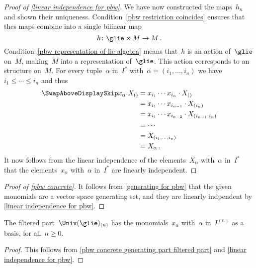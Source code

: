 \begin{proof}[Proof of \cref{linear independence for pbw}]
	We have now constructed the maps~$h_n$ and shown their uniqueness. 
	Condition~\ref{pbw restriction coincides} ensures that thes maps combine into a single bilinear map
	\[
		h
		\colon
		\glie \times M
		\to
		M \,.
	\]
	Condition~\ref{pbw representation of lie algebra} means that~$h$ is an action of~$\glie$ on~$M$, making~$M$ into a representation of~$\glie$.
	This action corresponds to an~\module{$\Univ(\glie)$} structure on~$M$.
	For every tuple~$\alpha$ in~$I^*$ with~$\alpha = (i_1, \dotsc, i_n)$ we have~$i_1 \leq \dotsb \leq i_n$ and thus
	\begin{align*}
		\SwapAboveDisplaySkip
		x_\alpha . X_{()}
		&=
		x_{i_1} \dotsm x_{i_n} \cdot X_{()}
		\\
		&=
		x_{i_1} \dotsm x_{i_{n-1}} \cdot X_{(i_n)}
		\\
		&=
		x_{i_1} \dotsm x_{i_{n-2}} \cdot X_{(i_{n-1}, i_n)}
		\\
		&=
		\dotsb
		\\
		&=
		X_{(i_1, \dotsc, i_n)}
		\\
		&=
		X_\alpha \,.
	\end{align*}
	It now follows from the linear independence of the elements~$X_\alpha$ with~$\alpha$ in~$I^*$ that the elements~$x_\alpha$ with~$\alpha$ in~$I^*$ are linearly independent.
\end{proof}


\begin{proof}[Proof of \cref{pbw concrete}]
	It follows from \cref{generating for pbw} that the given monomials are a vector space generating set, and they are linearly indpendent by \cref{linear independence for pbw}.
\end{proof}


\begin{corollary}
	\label{pbw concrete basis part filtered part}
	The filtered part~$\Univ(\glie)_{(n)}$ has the monomials~$x_\alpha$ with~$\alpha$ in~$I^{(n)}$ as a basis, for all~$n \geq 0$.
\end{corollary}


\begin{proof}
	This follows from \cref{pbw concrete generating part filtered part} and \cref{linear independence for pbw}.
\end{proof}


